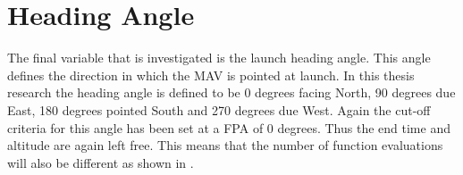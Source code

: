 %
%

\section{Heading Angle}
\label{sec:headingAngle}
The final variable that is investigated is the launch heading angle. This angle defines the direction in which the \ac{MAV} is pointed at launch. In this thesis research the heading angle is defined to be 0 degrees facing North, 90 degrees due East, 180 degrees pointed South and 270 degrees due West. Again the cut-off criteria for this angle has been set at a \ac{FPA} of 0 degrees. Thus the end time and altitude are again left free. This means that the number of function evaluations will also be different as shown in .


%





